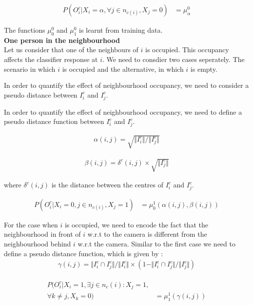\documentclass[10pt,twocolumn,letterpaper]{article}
\begin{document}
\begin{align}
 P(O^{c}_{i} |X_{i}=\alpha ,\forall j \in{n_{c(i)}},X_{j} =0)  &=\mu^{0}_{\alpha}
\end{align}

The functions $ \mu^{0}_{0} $  and $ \mu^{0}_{1} $ is learnt from training data. \\

\textbf{One person in the neighbourhood}\\
Let us consider that one of the neighbours of $ i$ is occupied. This occupancy affects the classifier response at $ i$. We need to consdier two cases seperately. The scenario in which $ i $ is occupied and the alternative, in which $ i$ is empty.

In order to quantify the effect of neighbourhood occupancy, we need to consider a pseudo distance between $I_{i}^{c}$ and $I_{j}^{c}$.
 
In order to quantify the effect of neighbourhood occupancy, we need to define a pseudo distance function between $I_{i}^{c}$ and $I_{j}^{c}$.

\begin{align}
\alpha(i,j) = \sqrt{\Vert I_{i}^{c}\Vert/\Vert I_{j}^{c}\Vert}
\end{align}

\begin{align}
\beta(i,j) = \delta^{c} (i,j)\times \sqrt{\Vert I_{j}^{c}\Vert}
\end{align}
 
 where $\delta^{c} (i,j)$ is the distance between the centres of $I_{i}^{c}$ and $I_{j}^{c}$.
 
\begin{align}
 P(O^{c}_{i} |X_{i}=0 , j \in{n_{c(i)}},X_{j} =1)  &=\mu^{1}_{0}(     \alpha(i,j),\beta(i,j))
\end{align}



For the case when $ i $ is occupied, we need to encode the fact that the neighbourhood in front of $i$ w.r.t to the camera is different from the neighbourhood behind $ i$ w.r.t the camera. Similar to the first case we need to define a pseudo distance function, which is given by :
\begin{align}
\gamma(i,j) = \Vert I_{i}^{c}\cap I_{j}^{c} \Vert / \Vert I_{i}^{c}\Vert \times (1 - \Vert I_{i}^{c}\cap I_{j}^{c} \Vert /\Vert I_{j}^{c}\Vert) 
\end{align}

\begin{align}
\begin{split}
P(O^{c}_{i} |X_{i}=1 , \exists j \in{n_{c}(i)}: X_{j} =1,\\ \forall k \neq j, X_{k} =0)  &=\mu^{1}_{1}(  \gamma(i,j))
\end{split}
\end{align}
\end{document}
